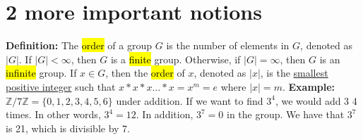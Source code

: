 \documentclass[12pt]{report}
\newcommand{\examples}[1]{{\leavevmode\color{Maroon} #1}}
\newcommand{\definitions}[1]{{\leavevmode\color{blue} #1}}
\begin{document}
	\section{2 more important notions}
	\definitions{
	\textbf{Definition: } The \hl{order} of a group $G$ is the number of elements in $G$, denoted as $|G|$. If $|G|<\infty$,  then $G$ is a \hl{finite} group. Otherwise, if $|G|=\infty$, then $G$ is an \hl{infinite} group. 
	\vskip 0.05in
	If $x\in G$, then the \hl{order} of $x$, denoted as $|x|$, is the \underline{smallest positive integer} such that $x*x*x\dots *x=x^m=e$ where $|x|=m$. 
	}
	\vskip 0.1in
	\examples{
	\textbf{Example: }$\mathbb{Z}/7\mathbb{Z}=\{0,1,2,3,4,5,6\}$ under addition. If we want to find $3^4$, we would add 3 4 times. In other words, $3^4=12$.
	\vskip 0.05in
	In addition, $3^7=0$ in the group. We have that $3^7$ is 21, which is divisible by 7.   
	}
	
\end{document}
